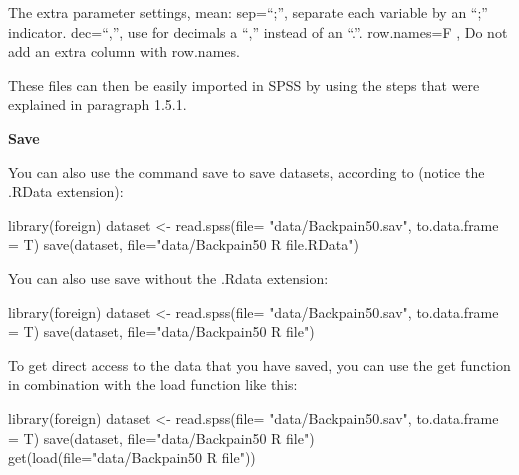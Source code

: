 \documentclass[
]{book}
\newenvironment{Shaded}{\begin{snugshade}}{\end{snugshade}}
\newcommand{\AttributeTok}[1]{\textcolor[rgb]{0.77,0.63,0.00}{#1}}
\newcommand{\FunctionTok}[1]{\textcolor[rgb]{0.00,0.00,0.00}{#1}}
\newcommand{\NormalTok}[1]{#1}
\newcommand{\OtherTok}[1]{\textcolor[rgb]{0.56,0.35,0.01}{#1}}
\newcommand{\StringTok}[1]{\textcolor[rgb]{0.31,0.60,0.02}{#1}}
\begin{document}
The extra parameter settings, mean:
sep=``;'', separate each variable by an ``;'' indicator.
dec=``,'', use for decimals a ``,'' instead of an ``.''.
row.names=F , Do not add an extra column with row.names.

These files can then be easily imported in SPSS by using the steps that were explained in paragraph 1.5.1.

\textbf{Save}

You can also use the command save to save datasets, according to (notice the .RData extension):

\begin{Shaded}
\begin{Highlighting}[]
\FunctionTok{library}\NormalTok{(foreign)}
\NormalTok{dataset }\OtherTok{\textless{}{-}} \FunctionTok{read.spss}\NormalTok{(}\AttributeTok{file=} \StringTok{"data/Backpain50.sav"}\NormalTok{, }\AttributeTok{to.data.frame =}\NormalTok{ T)}
\FunctionTok{save}\NormalTok{(dataset, }\AttributeTok{file=}\StringTok{"data/Backpain50 R file.RData"}\NormalTok{)}
\end{Highlighting}
\end{Shaded}

You can also use save without the .Rdata extension:

\begin{Shaded}
\begin{Highlighting}[]
\FunctionTok{library}\NormalTok{(foreign)}
\NormalTok{dataset }\OtherTok{\textless{}{-}} \FunctionTok{read.spss}\NormalTok{(}\AttributeTok{file=} \StringTok{"data/Backpain50.sav"}\NormalTok{, }\AttributeTok{to.data.frame =}\NormalTok{ T)}
\FunctionTok{save}\NormalTok{(dataset, }\AttributeTok{file=}\StringTok{"data/Backpain50 R file"}\NormalTok{)}
\end{Highlighting}
\end{Shaded}

To get direct access to the data that you have saved, you can use the get function in combination with the load function like this:

\begin{Shaded}
\begin{Highlighting}[]
\FunctionTok{library}\NormalTok{(foreign)}
\NormalTok{dataset }\OtherTok{\textless{}{-}} \FunctionTok{read.spss}\NormalTok{(}\AttributeTok{file=} \StringTok{"data/Backpain50.sav"}\NormalTok{, }\AttributeTok{to.data.frame =}\NormalTok{ T)}
\FunctionTok{save}\NormalTok{(dataset, }\AttributeTok{file=}\StringTok{"data/Backpain50 R file"}\NormalTok{)}
\FunctionTok{get}\NormalTok{(}\FunctionTok{load}\NormalTok{(}\AttributeTok{file=}\StringTok{"data/Backpain50 R file"}\NormalTok{))}
\end{Highlighting}
\end{Shaded}
\end{document}
